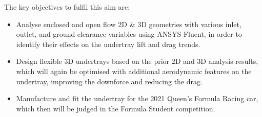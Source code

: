 \noindent
The key objectives to fulfil this aim are:
\begin{itemize}

    \item Analyse enclosed and open flow 2D \& 3D geometries with various inlet, outlet, and ground clearance variables using ANSYS Fluent, in order to identify their effects on the undertray lift and drag trends. 
    
    \item Design flexible 3D undertrays based on the prior 2D and 3D analysis results, which will again be optimised with additional aerodynamic features on the undertray, improving the downforce and reducing the drag.
	
    \item Manufacture and fit the undertray for the 2021 Queen’s Formula Racing car, which then will be judged in the Formula Student competition.
\end{itemize}